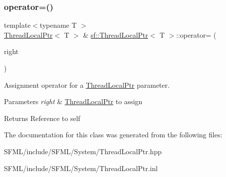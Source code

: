 \subsubsection{\texorpdfstring{operator=()}{operator=()}\hspace{0.1cm}{\footnotesize\ttfamily [2/2]}}
{\footnotesize\ttfamily template$<$typename T $>$ \\
\mbox{\hyperlink{classsf_1_1_thread_local_ptr}{Thread\+Local\+Ptr}}$<$ T $>$ \& \mbox{\hyperlink{classsf_1_1_thread_local_ptr}{sf\+::\+Thread\+Local\+Ptr}}$<$ T $>$\+::operator= (\begin{DoxyParamCaption}\item[{const \mbox{\hyperlink{classsf_1_1_thread_local_ptr}{Thread\+Local\+Ptr}}$<$ T $>$ \&}]{right }\end{DoxyParamCaption})}



Assignment operator for a \mbox{\hyperlink{classsf_1_1_thread_local_ptr}{Thread\+Local\+Ptr}} parameter. 


\begin{DoxyParams}{Parameters}
{\em right} & \mbox{\hyperlink{classsf_1_1_thread_local_ptr}{Thread\+Local\+Ptr}} to assign\\
\hline
\end{DoxyParams}
\begin{DoxyReturn}{Returns}
Reference to self \begin{DoxyVerb}\end{DoxyVerb}
 
\end{DoxyReturn}


The documentation for this class was generated from the following files\+:\begin{DoxyCompactItemize}
\item 
S\+F\+M\+L/include/\+S\+F\+M\+L/\+System/Thread\+Local\+Ptr.\+hpp\item 
S\+F\+M\+L/include/\+S\+F\+M\+L/\+System/Thread\+Local\+Ptr.\+inl\end{DoxyCompactItemize}

